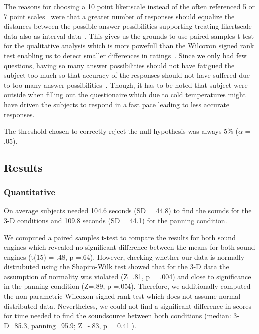 \documentclass[journal]{IEEEtran}
\begin{document}
The reasons for choosing a 10 point likertscale instead of the often referenced 5 or 7 point scales~\cite{} were that a greater number of responses should equalize the distances between the possible answer possibilities supporting treating likertscale data also as interval data~\cite{}. This gives us the grounds to use paired samples t-test for the qualitative analysis which is more powefull than the Wilcoxon signed rank test enabling us to detect smaller differences in ratings~\cite{}. Since we only had few questions, having so many answer possibilities should not have fatigued the subject too much so that accuracy of the responses should not have suffered due to too many answer possibilities~\cite{}. Though, it has to be noted that subject were outside when filling out the questionaire which due to cold temperatures might have driven the subjects to respond in a fast pace leading to less accurate responses.

The threshold chosen to correctly reject the null-hypothesis was always 5\% ($\alpha$ = .05).

\subsection{Results}
\subsubsection{Quantitative}
On average subjects needed 104.6 seconds (SD = 44.8) to find the sounds for the 3-D conditions and 109.8 seconds (SD = 44.1) for the panning condition. 

We computed a paired samples t-test to compare the results for both sound engines which revealed no significant difference between the means for both sound engines (t(15) =-.48, p =.64). However, checking whether our data is normally distrubuted using the Shapiro-Wilk test showed that for the 3-D data the assumption of normality was violated (Z=.81, p = .004) and close to significance in the panning condition (Z=.89, p =.054). Therefore, we additionally computed the non-parametric Wilcoxon signed rank test which does not assume normal distributed data. Nevertheless, we could not find a significant difference in scores for time needed to find the soundsource between both conditions (median: 3-D=85.3, panning=95.9; Z=-.83, p = 0.41 ). 
\end{document}
